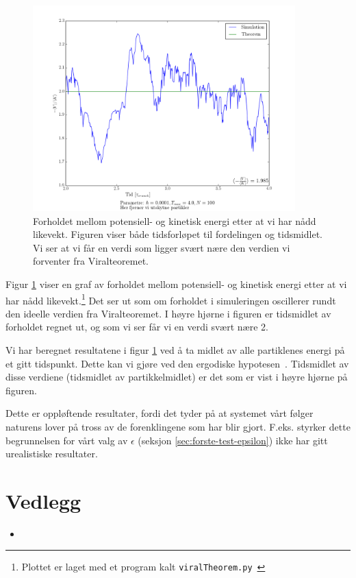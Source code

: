 \documentclass[11pt]{article}
\begin{document}
\begin{figure}[!ht]
  \centering
  \includegraphics[width=\textwidth,height=300px]{../fig/viral.png}
  \caption{\label{fig:viral} Forholdet mellom potensiell- og kinetisk
 energi etter at vi har nådd likevekt. Figuren viser både tidsforløpet
til fordelingen og tidsmidlet. Vi ser at vi får en verdi som ligger
svært nære den verdien vi forventer fra Viralteoremet.}
\end{figure}
\begin{multicols*}{2}

Figur \ref{fig:viral} viser en graf av forholdet mellom potensiell- og
kinetisk energi etter at vi har nådd likevekt.\footnote{Plottet er
  laget med et program kalt
  \texttt{viralTheorem.py}~\cite{github-repo}} Det ser ut som om
forholdet i simuleringen oscillerer rundt den ideelle verdien fra
Viralteoremet. I høyre hjørne i figuren er tidsmidlet av forholdet
regnet ut, og som vi ser får vi en verdi svært nære 2. 

Vi har beregnet resultatene i figur \ref{fig:viral} ved å ta midlet av
alle partiklenes energi på et gitt tidspunkt. Dette kan vi gjøre ved
den ergodiske hypotesen~\cite{ergodisk-hypotese}. Tidsmidlet av disse
verdiene (tidsmidlet av partikkelmidlet) er det som er vist i høyre
hjørne på figuren.

Dette er oppløftende resultater, fordi det tyder på at systemet vårt følger
naturens lover på tross av de forenklingene som har blir
gjort. F.eks. styrker dette begrunnelsen for vårt valg av $\epsilon$
(seksjon \ref{sec:forste-test-epsilon}) ikke har gitt urealistiske
resultater. 




\end{multicols*}
\clearpage
\printbibliography
\clearpage
\section{Vedlegg}
\begin{itemize}
  \item[]
\end{itemize}
\end{document}
